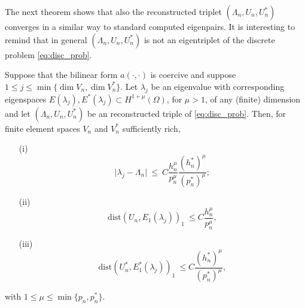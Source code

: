 \documentclass[smallextended]{svjour3}
\begin{document}
The next theorem shows that also the reconstructed triplet $(\Lambda_n,U_n,U_n^*)$ converges in a similar way to standard computed eigenpairs. It is interesting to remind that in general $(\Lambda_n,U_n,U_n^*)$ is not an eigentriplet of the discrete problem \eqref{eq:disc_prob}.


\begin{theorem}
\label{th:adj_rec}
Suppose  that the bilinear form $a(\cdot,\cdot)$ is coercive and suppose
$ 1 \leq j\leq \min\{\dim V_n,\dim V_n^*\}$. 
Let
$\lambda_j$ be an eigenvalue with
corresponding eigenspaces $E(\lambda_j),E^*(\lambda_j)\subset H^{1+\mu}(\Omega)$, for $\mu>1$, of any (finite) dimension  and
let $(\Lambda_n,U_n,U_n^*)$ be an  reconstructed triple  of \eqref{eq:disc_prob}.
Then, for finite element spaces $V_n$ and $V_n^*$ sufficiently rich,


\begin{itemize}
\item[(i)] 
\begin{equation}\label{eq:supereig_rec}
\vert \lambda_j - \Lambda_n \vert \ \leq \ C
\frac{h_n^{\mu} }{p_n^{\mu}}\frac{(h_n^*)^{\mu} }{(p_n^*)^{\mu}};  
\end{equation}
\item[(ii)] 
\begin{equation}
\label{eq:energy_rec} \mathrm{dist}(
U_n,E_1(\lambda_j))_{1} \ \leq
C \frac{h_n^{\mu}}{p_n^{\mu}}, 
\end{equation}
\item[(iii)]
\begin{equation}
\label{eq:energy_dual_rec} \mathrm{dist}(
U_n^*,E_1^*(\lambda_j))_{1} \ \leq
C \frac{(h_n^*)^{\mu}}{(p_n^*)^{\mu}}, 
\end{equation}
\end{itemize}
with $1\leq \mu\leq \min\{p_n,p_n^*\}$.
\end{theorem}
\end{document}
